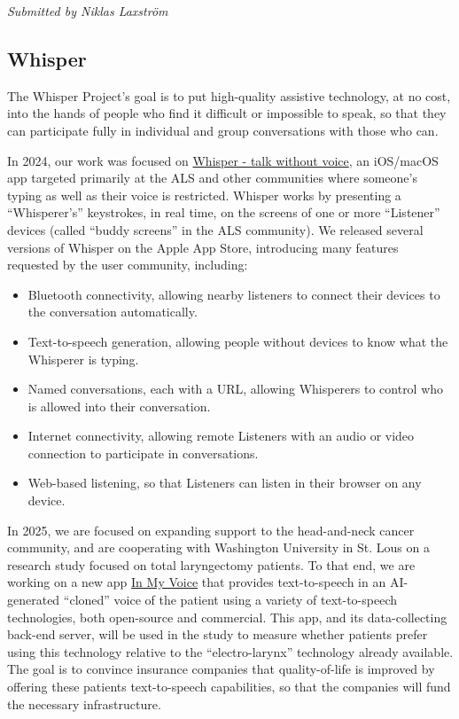 \documentclass[a4paper]{report}
\begin{document}
{\em Submitted by Niklas Laxström}

\subsection{Whisper}

The Whisper Project’s goal is to put high-quality assistive technology, at no cost, into the hands of people who find it difficult or impossible to speak, so that they can participate fully in individual and group conversations with those who can.

In 2024, our work was focused on \href{https://apps.apple.com/us/app/whisper-talk-without-voice/id6446479064}{Whisper - talk without voice}, an iOS/macOS app targeted primarily at the ALS and other communities where someone’s typing as well as their voice is restricted. Whisper works by presenting a “Whisperer’s” keystrokes, in real time, on the screens of one or more “Listener” devices (called “buddy screens” in the ALS community). We released several versions of Whisper on the Apple App Store, introducing many features requested by the user community, including:

\begin{itemize}

\item Bluetooth connectivity, allowing nearby listeners to connect their devices to the conversation automatically.
\item Text-to-speech generation, allowing people without devices to know what the Whisperer is typing.
\item Named conversations, each with a URL, allowing Whisperers to control who is allowed into their conversation.
\item Internet connectivity, allowing remote Listeners with an audio or video connection to participate in conversations.
\item Web-based listening, so that Listeners can listen in their browser on any device.

\end{itemize}

In 2025, we are focused on expanding support to the head-and-neck cancer community, and are cooperating with Washington University in St. Lous on a research study focused on total laryngectomy patients. To that end, we are working on a new app \href{https://apps.apple.com/us/app/in-my-voice/id6742593911}{In My Voice} that provides text-to-speech in an AI-generated “cloned” voice of the patient using a variety of text-to-speech technologies, both open-source and commercial. This app, and its data-collecting back-end server, will be used in the study to measure whether patients prefer using this technology relative to the “electro-larynx” technology already available. The goal is to convince insurance companies that quality-of-life is improved by offering these patients text-to-speech capabilities, so that the companies will fund the necessary infrastructure.
\end{document}

